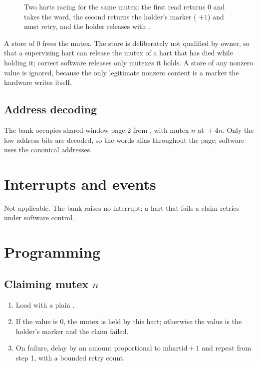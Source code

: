 \begin{figure}[htpb]
	\centering
	
	\caption{Two harts racing for the same mutex: the first read returns 0 and takes the word, the second returns the holder's marker ( $+ 1$) and must retry, and the holder releases with .}
	\label{fig:mutex-claim}
\end{figure}

A store of 0 frees the mutex. The store is deliberately not qualified by owner, so that a supervising hart can release the mutex of a hart that has died while holding it; correct software releases only mutexes it holds. A store of any nonzero value is ignored, because the only legitimate nonzero content is a marker the hardware writes itself.

\subsection{Address decoding}

The bank occupies shared-window page 2 from \texttt{\MutexBaseAddress}, with mutex $n$ at \texttt{\MutexBaseAddress}${}+4n$. Only the low address bits are decoded, so the words alias throughout the page; software uses the canonical addresses.

\section{Interrupts and events}

Not applicable. The bank raises no interrupt; a hart that fails a claim retries under software control.

\section{Programming}

\subsection{Claiming mutex $n$}

\begin{enumerate}
	\item Load  with a plain .
	\item If the value is 0, the mutex is held by this hart; otherwise the value is the holder's marker and the claim failed.
	\item On failure, delay by an amount proportional to $\mathrm{mhartid} + 1$ and repeat from step 1, with a bounded retry count.
\end{enumerate}

